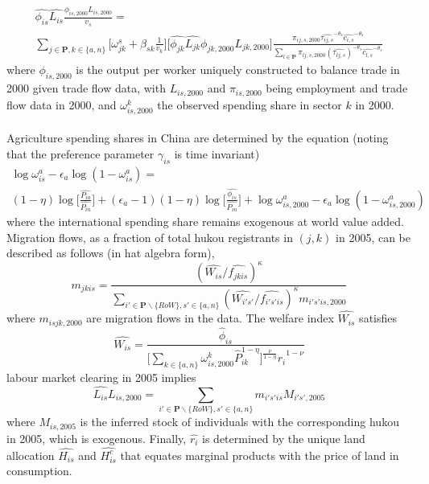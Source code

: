 \documentclass[]{article}
\theoremstyle{plain}
\begin{document}
\begin{equation}
\begin{aligned}
	\hat{\phi_{is}}\hat{L_{is}}\frac{\phi_{is, 2000}L_{is, 2000}}{v_{s}} =  \\ 
	\sum_{j \in \mathbf{P}, k \in \{a, n\}}\bigg[\omega^{s}_{jk} + \beta_{s k}\frac{1}{v_{k}}\bigg]\bigg[\hat{\phi_{jk}}\hat{L_{jk}}\phi_{jk, 2000}L_{jk, 2000}\bigg] \frac{\pi_{ij, s, 2000}\hat{\tau_{ij, s}}^{-\theta_{s}}\hat{c_{i, s}}^{-\theta_{s}}}{\sum_{l \in \mathbf{P}}\pi_{lj, s, 2000}(\hat{\tau_{lj,s}})^{-\theta_{s}}\hat{c_{l, s}}^{-\theta_{s}}}
\end{aligned}
\end{equation}
where $\phi_{is, 2000}$ is the output per worker uniquely constructed to balance trade in 2000 given trade flow data, with $L_{is, 2000}$ and $\pi_{is, 2000}$ being employment and trade flow data in 2000, and $\omega^{k}_{is, 2000}$ the observed spending share in sector $k$ in 2000.
\paragraph*{}
Agriculture spending shares in China are determined by the equation (noting that the preference parameter $\gamma_{is}$ is time invariant) 
\begin{equation}
	\begin{aligned}
	\log\omega^{a}_{is} - \epsilon_{a}\log(1-\omega^{a}_{is}) = \\ (1-\eta)\log\bigg[\frac{\hat{P_{ia}}}{\hat{P_{in}}}\bigg] + (\epsilon_{a}-1)(1-\eta)\log\bigg[\frac{\hat{\phi_{is}}}{\hat{P_{in}}}\bigg] + \log\omega^{a}_{is,2000} - \epsilon_{a}\log(1-\omega^{a}_{is,2000})
	\end{aligned}
\end{equation}
where the international spending share remains exogenous at world value added. Migration flows, as a fraction of total hukou registrants in $(j,k)$ in 2005, can be described as follows (in hat algebra form), 
\begin{equation}
m_{jkis} = \frac{(\hat{W_{is}}/\hat{f_{jkis}})^{\kappa}}{\sum_{i' \in \mathbf{P} \backslash \{RoW\}, s'\in \{a, n\}}(\hat{W_{i's'}}/\hat{f_{i's'is}})^{\kappa}m_{i's'is, 2000}}
\end{equation}
where $m_{isjk,2000}$ are migration flows in the data. The welfare index $\hat{W_{is}}$ satisfies
\begin{equation}\label{welfareindex}
	\hat{W_{is}} = \frac{\hat{\phi}_{is}}{\bigg[\sum_{k \in \{a, n\}}\omega_{is, 2000}^{k}\hat{P}_{ik}^{1-\eta}\bigg]^{\frac{\nu}{1-\eta}}\hat{r_{i}}^{1-\nu}}
\end{equation}
labour market clearing in 2005 implies
\begin{equation}
	\hat{L_{is}}L_{is, 2000} = \sum_{i' \in \mathbf{P} \backslash \{RoW\}, s'\in \{a, n\}}m_{i's'is}M_{i's', 2005}
\end{equation}
where $M_{is, 2005}$ is the inferred stock of individuals with the corresponding hukou in 2005, which is exogenous. Finally, $\hat{r_{i}}$ is determined by the unique land allocation  $\hat{H_{is}}$ and $\hat{H^{c}_{is}}$ that equates marginal products with the price of land in consumption. 
\end{document}
